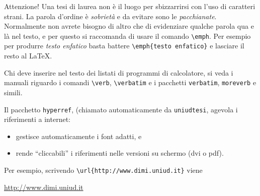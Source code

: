 Attenzione! Una tesi di laurea non è il luogo per
sbizzarrirsi con l'uso di caratteri strani. La parola
d'ordine è \emph{sobrietà} e da evitare sono le
\emph{pacchianate}. Normalmente non avrete bisogno di
altro che di evidenziare qualche parola qua e là nel
testo, e per questo si raccomanda di usare il comando
\verb!\emph!. Per esempio per produrre
\emph{testo enfatico} basta battere
\verb!\emph{testo enfatico}! e lasciare il resto al
\LaTeX.

Chi deve inserire nel testo dei listati di programmi di
calcolatore, si veda i manuali riguardo i comandi
\verb!\verb!, \verb!\verbatim! e i pacchetti
\verb!verbatim!, \verb!moreverb! e simili.

Il pacchetto \verb!hyperref!, (chiamato automaticamente da \verb!uniudtesi!, agevola i riferimenti a internet:

\begin{itemize}

\item gestisce automaticamente i font adatti, e 

\item rende ``cliccabili'' i riferimenti nelle versioni su schermo (dvi o pdf).

\end{itemize}

\noindent Per esempio, scrivendo \verb!\url{http://www.dimi.uniud.it}! viene

\begin{center}
\url{http://www.dimi.uniud.it}
\end{center}